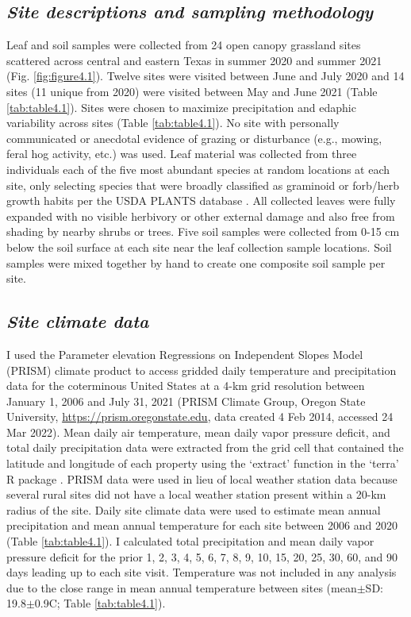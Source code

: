 \subsection{\textit{Site descriptions and sampling methodology}}
\noindent Leaf and soil samples were collected from 24 open canopy grassland sites scattered across central and eastern Texas in summer 2020 and summer 2021 (Fig. \ref{fig:figure4.1}). Twelve sites were visited between June and July 2020 and 14 sites (11 unique from 2020) were visited between May and June 2021 (Table \ref{tab:table4.1}). Sites were chosen to maximize precipitation and edaphic variability across sites (Table \ref{tab:table4.1}). No site with personally communicated or anecdotal evidence of grazing or disturbance (e.g., mowing, feral hog activity, etc.) was used. Leaf material was collected from three individuals each of the five most abundant species at random locations at each site, only  selecting species that were broadly classified as graminoid or forb/herb growth habits per the USDA PLANTS database . All collected leaves were fully expanded with no visible herbivory or other external damage and also free from shading by nearby shrubs or trees. Five soil samples were collected from 0-15 cm below the soil surface at each site near the leaf collection sample locations. Soil samples were mixed together by hand to create one composite soil sample per site.

\subsection{\textit{Site climate data}}
\noindent I used the Parameter elevation Regressions on Independent Slopes Model (PRISM)  climate product to access gridded daily temperature and precipitation data for the coterminous United States at a 4-km grid resolution between January 1, 2006 and July 31, 2021 (PRISM Climate Group, Oregon State University, \url{https://prism.oregonstate.edu}, data created 4 Feb 2014, accessed 24 Mar 2022). Mean daily air temperature, mean daily vapor pressure deficit, and total daily precipitation data were extracted from the grid cell that contained the latitude and longitude of each property using the `extract’ function in the `terra’ R package . PRISM data were used in lieu of local weather station data because several rural sites did not have a local weather station present within a 20-km radius of the site. Daily site climate data were used to estimate mean annual precipitation and mean annual temperature for each site between 2006 and 2020 (Table \ref{tab:table4.1}). I calculated total precipitation and mean daily vapor pressure deficit for the prior 1, 2, 3, 4, 5, 6, 7, 8, 9, 10, 15, 20, 25, 30, 60, and 90 days leading up to each site visit. Temperature was not included in any analysis due to the close range in mean annual temperature between sites (mean$\pm$SD: 19.8$\pm$0.9\textdegree{}C; Table \ref{tab:table4.1}).

